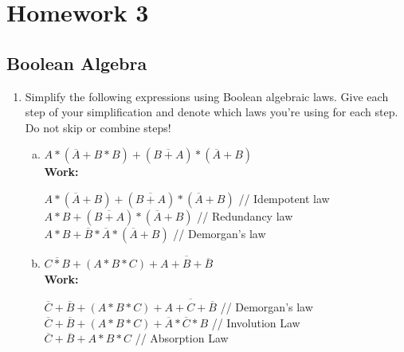 \documentclass[11pt]{article}
\begin{document}
\section{Homework 3}

\subsection{Boolean Algebra}
\begin{enumerate}
    \item Simplify the following expressions using Boolean algebraic laws. Give each step of your simplification and denote which laws you’re using for each step. Do not skip or combine steps!
    \begin{enumerate}[(a)]
        \item  $A * (\overline{A}+B*B) + (\overline{B+A}) * (\overline{A} + B)$\\
        \textbf{Work:}
        \begin{center}
            $A * (\overline{A} + B) + (\overline{B + A}) * (\overline{A} + B)$ // Idempotent law\\
            $A * B + (\overline{B + A}) * (\overline{A} + B)$ // Redundancy law\\
            $A * B + \overline{B} * \overline{A} * (\overline{A} + B)$ // Demorgan's law\\
        \end{center} 
        \item $\overline{C * B} + ( A * B * C) + \overline{A + B + \overline{B}}$\\
        \textbf{Work:}
        \begin{center}
            $\overline{C} + \overline{B} + (A * B * C) + \overline{A + C + \overline{B}}$ // Demorgan's law\\
            $\overline{C} + \overline{B} + (A * B * C) + \overline{A} * \overline{C} * B$ // Involution Law\\
            $\overline{C} + \overline{B} + A * B * C$ // Absorption Law\\

\end{center}
\end{enumerate}
\end{enumerate}
\end{document}

